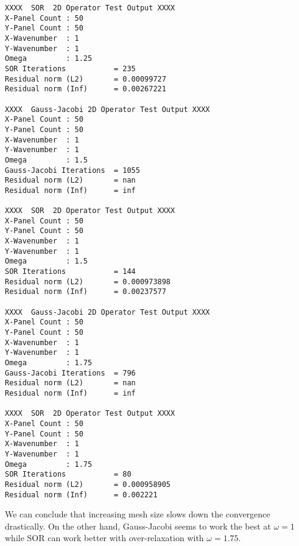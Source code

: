 \documentclass[12pt,a4paper]{article}
\begin{document}
\begin{verbatim}
XXXX  SOR  2D Operator Test Output XXXX 
X-Panel Count : 50
Y-Panel Count : 50
X-Wavenumber  : 1
Y-Wavenumber  : 1
Omega         : 1.25
SOR Iterations           = 235
Residual norm (L2)       = 0.00099727
Residual norm (Inf)      = 0.00267221

XXXX  Gauss-Jacobi 2D Operator Test Output XXXX 
X-Panel Count : 50
Y-Panel Count : 50
X-Wavenumber  : 1
Y-Wavenumber  : 1
Omega         : 1.5
Gauss-Jacobi Iterations  = 1055
Residual norm (L2)       = nan
Residual norm (Inf)      = inf

XXXX  SOR  2D Operator Test Output XXXX 
X-Panel Count : 50
Y-Panel Count : 50
X-Wavenumber  : 1
Y-Wavenumber  : 1
Omega         : 1.5
SOR Iterations           = 144
Residual norm (L2)       = 0.000973898
Residual norm (Inf)      = 0.00237577

XXXX  Gauss-Jacobi 2D Operator Test Output XXXX 
X-Panel Count : 50
Y-Panel Count : 50
X-Wavenumber  : 1
Y-Wavenumber  : 1
Omega         : 1.75
Gauss-Jacobi Iterations  = 796
Residual norm (L2)       = nan
Residual norm (Inf)      = inf

XXXX  SOR  2D Operator Test Output XXXX 
X-Panel Count : 50
Y-Panel Count : 50
X-Wavenumber  : 1
Y-Wavenumber  : 1
Omega         : 1.75
SOR Iterations           = 80
Residual norm (L2)       = 0.000958905
Residual norm (Inf)      = 0.002221
\end{verbatim}
We can conclude that increasing mesh size slows down the convergence drastically. On the other hand, Gauss-Jacobi seems to work the best at $\omega = 1$ while SOR can work better with over-relaxation with $\omega = 1.75$. 
\end{document}
